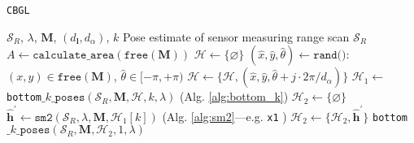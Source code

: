 \begin{algorithm}[]
  \caption{\texttt{CBGL}}
  \begin{spacing}{1.0}
  \begin{algorithmic}[1]
    \REQUIRE $\mathcal{S}_R$, $\lambda$, $\bm{M}$, $(d_{\bm{l}}, d_\alpha)$, $k$
    \ENSURE Pose estimate of sensor measuring range scan $\mathcal{S}_R$ %
    \STATE $A \leftarrow \texttt{calculate\_area}(\texttt{free}(\bm{M}))$
    \STATE $\mathcal{H} \leftarrow \{\varnothing\}$
      \STATE \small $(\hat{x},\hat{y},\hat{\theta}) \leftarrow \texttt{rand()}$: $(x,y) \in \texttt{free}(\bm{M})$, $\hat{\theta} \in [-\pi,+\pi)$
        \STATE $\mathcal{H} \leftarrow \{\mathcal{H}, (\hat{x}, \hat{y}, \hat{\theta} + j \cdot 2\pi / d_{\alpha})\}$     \label{alg:cbgl:h}
      \ENDFOR
    \ENDFOR
    \STATE $\mathcal{H}_1 \leftarrow$ \texttt{bottom}$\_k\_\texttt{poses}(\mathcal{S}_R, \bm{M}, \mathcal{H}, k, \lambda)$ \hfill {\small (Alg. \ref{alg:bottom_k}}) \label{alg:cbgl:h1}
    \STATE $\mathcal{H}_2 \leftarrow \{\varnothing \}$
      \STATE $\hat{\bm{h}}^\prime \leftarrow \texttt{sm2}(\mathcal{S}_R, \lambda, \bm{M}, \mathcal{H}_1[k])$ \hfill {\small (Alg. \ref{alg:sm2}---e.g. \texttt{x1} \cite{Filotheou2023a}})
      \STATE $\mathcal{H}_2 \leftarrow \{\mathcal{H}_2, \hat{\bm{h}}^\prime\}$  \label{alg:cbgl:h2}
    \ENDFOR
    \RETURN \texttt{bottom}$\_k\_\texttt{poses}(\mathcal{S}_R, \bm{M}, \mathcal{H}_2, 1, \lambda)$
  \end{algorithmic}
  \end{spacing}
  \label{alg:cbgl}
\end{algorithm}

